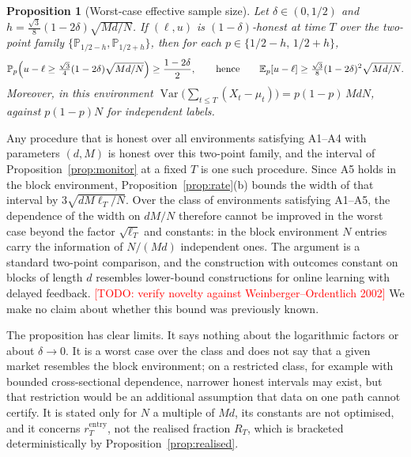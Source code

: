 \documentclass[11pt]{article}
\newtheorem{proposition}{Proposition}
\theoremstyle{remark}
\newcommand{\todo}[1]{\textcolor{red}{[TODO: #1]}}
\newcommand{\E}{\mathbb{E}}
\newcommand{\Prob}{\mathbb{P}}
\newcommand{\rentry}{r_T^{\mathrm{entry}}}
\begin{document}
\begin{proposition}[Worst-case effective sample size]
\label{prop:lower}
Let $\delta\in(0,1/2)$ and $h=\frac{\sqrt3}{8}(1-2\delta)\sqrt{Md/N}$. If $(\ell,u)$ is
$(1-\delta)$-honest at time $T$ over the two-point family
$\{\Prob_{1/2-h},\Prob_{1/2+h}\}$, then for each $p\in\{1/2-h,\,1/2+h\}$,
\[
\Prob_p\Bigl(u-\ell\ge\tfrac{\sqrt3}{4}(1-2\delta)\sqrt{Md/N}\Bigr)\ge\frac{1-2\delta}{2},
\qquad\text{hence}\qquad
\E_p[u-\ell]\ge\tfrac{\sqrt3}{8}(1-2\delta)^2\sqrt{Md/N}.
\]
Moreover, in this environment
$\operatorname{Var}\bigl(\sum_{t\le T}(X_t-\mu_t)\bigr)=p(1-p)\,MdN$, against $p(1-p)N$ for
independent labels.
\end{proposition}

Any procedure that is honest over all environments satisfying A1--A4 with parameters $(d,M)$ is
honest over this two-point family, and the interval of Proposition~\ref{prop:monitor} at a fixed
$T$ is one such procedure. Since A5 holds in the block environment,
Proposition~\ref{prop:rate}(b) bounds the width of that interval by
$3\sqrt{dM\ell_T/N}$. Over the class of environments satisfying A1--A5, the dependence of the
width on $dM/N$ therefore cannot be improved in the worst case beyond the factor
$\sqrt{\ell_T}$ and constants: in the block environment $N$ entries carry the information of
$N/(Md)$ independent ones. The argument is a standard two-point comparison, and the construction
with outcomes constant on blocks of length $d$ resembles lower-bound constructions for online
learning with delayed feedback.
\todo{verify novelty against Weinberger--Ordentlich 2002}
We make no claim about whether this bound was previously known.

The proposition has clear limits. It says nothing about the logarithmic factors or about
$\delta\to0$. It is a worst case over the class and does not say that a given market resembles
the block environment; on a restricted class, for example with bounded cross-sectional
dependence, narrower honest intervals may exist, but that restriction would be an additional
assumption that data on one path cannot certify. It is stated only for $N$ a multiple of $Md$,
its constants are not optimised, and it concerns $\rentry$, not the realised fraction $R_T$,
which is bracketed deterministically by Proposition~\ref{prop:realised}.
\end{document}
